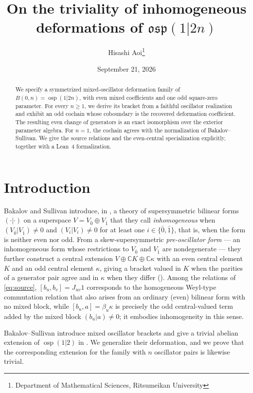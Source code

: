 \documentclass[11pt]{article}
\title{On the triviality of inhomogeneous deformations of $\mathfrak{osp}(1|2n)$}
\author{Hisashi Aoi\thanks{Department of Mathematical Sciences, Ritsumeikan University}}
\date{September 21, 2026}
\numberwithin{equation}{section}
\theoremstyle{remark}
\begin{document}
\maketitle

\begin{abstract}
We specify a symmetrized mixed-oscillator deformation family of
$B(0,n)=\operatorname{osp}(1|2n)$, with even mixed coefficients and one
odd square-zero parameter. For every $n\geq1$, we derive its bracket from a
faithful oscillator realization and exhibit an odd cochain whose coboundary
is the recovered deformation coefficient. The resulting even change of generators
is an exact isomorphism over the exterior parameter algebra. For $n=1$, the
cochain agrees with the normalization of Bakalov--Sullivan. We give the source
relations and the even-central specialization explicitly, together with a
Lean~4 formalization.
\end{abstract}

\section{Introduction}\label{sec:introduction}

Bakalov and Sullivan introduce, in \cite{BS17}, a theory of supersymmetric
bilinear forms $(\cdot|\cdot)$ on a superspace $V=V_{\bar0}\oplus V_{\bar1}$
that they call \emph{inhomogeneous} when $(V_{\bar0}|V_{\bar1})\neq0$ and
$(V_i|V_i)\neq0$ for at least one $i\in\{\bar0,\bar1\}$, that is, when the
form is neither even nor odd. From a skew-supersymmetric \emph{pre-oscillator
form} --- an inhomogeneous form whose restrictions to $V_{\bar0}$ and
$V_{\bar1}$ are nondegenerate --- they further construct a central
extension $V\oplus\mathbb CK\oplus\mathbb C\kappa$ with an even central
element $K$ and an odd central element $\kappa$, giving a bracket valued
in $K$ when the parities of a generator pair agree and in $\kappa$ when
they differ (\cite[Section~4]{BS17}). Among the relations of
\eqref{eq:source}, $[b_u,b_v]=J_{uv}1$ corresponds to the homogeneous
Weyl-type commutation relation that also arises from an ordinary (even)
bilinear form with no mixed block, while $[b_u,a]=\beta_u\kappa$ is
precisely the odd central-valued term added by the mixed block
$(b_u|a)\neq0$; it embodies inhomogeneity in this sense.

Bakalov--Sullivan introduce mixed oscillator brackets and give a trivial
abelian extension of $\operatorname{osp}(1|2)$ in \cite[Section~4]{BS17}.
We generalize their deformation, and we prove that the corresponding
extension for the family with $n$ oscillator pairs is likewise trivial.
\end{document}
